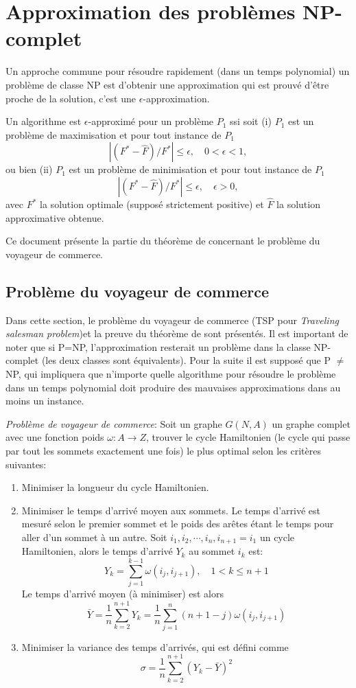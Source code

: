 \documentclass[../main.tex]{subfiles}
\begin{document}
\section{Approximation des problèmes NP-complet}
Un approche commune pour résoudre rapidement (dans un temps polynomial) un problème de classe NP est d'obtenir une approximation qui est prouvé d'être proche de la solution, c'est une $\epsilon$-approximation.

\begin{definition}
Un algorithme est $\epsilon$-approximé pour un problème $P_1$ ssi soit (i) $P_1$ est un problème de maximisation et pour tout instance de $P_1$
\[
|(F^* - \hat{F})/F^*| \leq \epsilon, \quad 0 < \epsilon < 1,
\]
ou bien (ii) $P_1$ est un problème de minimisation et pour tout instance de $P_1$
\[
|(F^* - \hat{F})/F^*| \leq \epsilon, \quad \epsilon > 0,
\]
avec $F^*$ la solution optimale (supposé strictement positive) et $\hat{F}$ la solution approximative obtenue.
\end{definition}

Ce document présente la partie du théorème de \cite{Sahni1976} concernant le problème du voyageur de commerce.

\subsection{Problème du voyageur de commerce}
Dans cette section, le problème du voyageur  de commerce (TSP pour \emph{Traveling salesman problem})et la preuve du théorème de \cite{Sahni1976} sont présentés. Il est important de noter que si P=NP, l'approximation resterait un problème dans la classe NP-complet (les deux classes sont équivalents). Pour la suite il est supposé que P $\neq$ NP, qui impliquera que n'importe quelle algorithme pour résoudre le problème dans un temps polynomial doit produire des mauvaises approximations dans au moins un instance.

\noindent \emph{Problème de voyageur de commerce}: Soit un graphe $G(N, A)$ un graphe complet avec une fonction poids $\omega : A \rightarrow Z$, trouver le cycle Hamiltonien (le cycle qui passe par tout les sommets exactement une fois) le plus optimal selon les critères suivantes:
\begin{enumerate}
\item Minimiser la longueur du cycle Hamiltonien.
\item Minimiser le temps d'arrivé moyen aux sommets. Le temps d'arrivé est mesuré selon le premier sommet et le poids des arêtes étant le temps pour aller d'un sommet à un autre. Soit $i_1, i_2, \cdots , i_n, i_{n+1}=i_1$ un cycle Hamiltonien, alors le temps d'arrivé $Y_k$ au sommet $i_k$ est:
\[
Y_k = \sum _{j = 1} ^{k-1} \omega (i_j, i_{j+1}), \quad 1 < k \leq n+1
\]
Le temps d'arrivé moyen (à minimiser) est alors
\[
\bar{Y} = \frac{1}{n} \sum _{k = 2} ^{n+1} Y_k = \frac{1}{n} \sum _{j = 1} ^{n} (n+1-j)\omega (i_j, i_{j+1})
\]
\item Minimiser la variance des temps d'arrivés, qui est défini comme
\[
\sigma = \frac{1}{n}\sum_{k = 2}^{n+1} (Y_k - \bar{Y})^2
\]
\end{enumerate}
\end{document}
